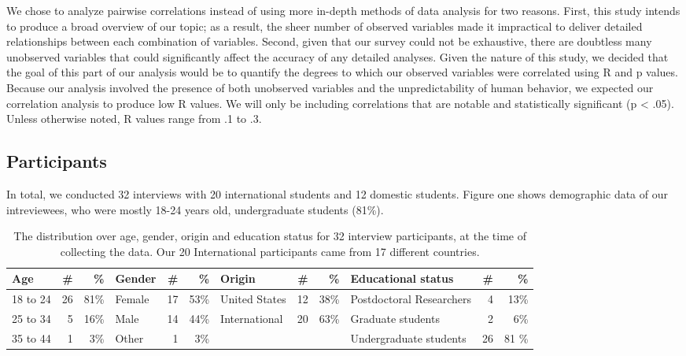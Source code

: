 We chose to analyze pairwise correlations instead of using more in-depth
methods of data analysis for two reasons. First, this study intends to produce
a broad overview of our topic; as a result, the sheer number of observed
variables made it impractical to deliver detailed relationships between each
combination of variables. Second, given that our survey could not be
exhaustive, there are doubtless many unobserved variables that could
significantly affect the accuracy of any detailed analyses. Given the nature
of this study, we decided that the goal of this part of our analysis would be
to quantify the degrees to which our observed variables were correlated using
R and p values. Because our analysis involved the presence of both unobserved variables and
the unpredictability of human behavior, we expected our correlation analysis
to produce low R values. We will only be including correlations that are
notable and statistically significant (p < .05). Unless otherwise noted, R
values range from .1 to .3. 

\subsection{Participants} In total, we conducted 32 interviews with 20
international students and 12 domestic students. Figure one shows demographic data of our intreviewees, who were mostly 18-24 years old, undergraduate students (81\%).

\begin{table*}[h!]
\centering
\begin{tabular}{l r r |l r r|l r r|l r r} 
 \hline
 Age & \# & \% & Gender & \# & \% & Origin & \# & \% & Educational status & \# & \% \\
\hline
18 to 24 & 26 & 81\% & Female & 17 & 53\% & United States & 12 & 38\% & Postdoctoral Researchers & 4 & 13\% \\
25 to 34 & 5 & 16\% & Male & 14 & 44\% & International & 20 & 63\% & Graduate students & 2 & 6\% \\
35 to 44 & 1 & 3\% & Other & 1 & 3\% & & & & Undergraduate students & 26 & 81 \% \\
 \hline
\end{tabular}
\caption{The distribution over age, gender, origin and education status for 32 interview participants, at the time of collecting the data. Our 20 International participants came from 17 different countries.}
\label{table:1}
\end{table*}

